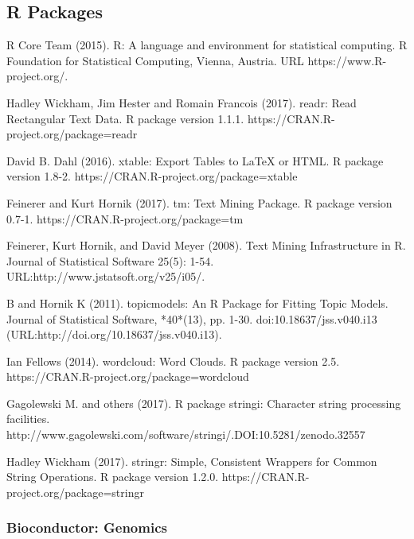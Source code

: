 
\begin{thebibliography}{00}
	\tiny
	\subsection{R Packages}
	
	R Core Team (2015). 
	\newblock R: A language and environment for statistical computing. R Foundation for Statistical Computing, Vienna, Austria.
	\newblock URL https://www.R-project.org/.
	
	 Hadley Wickham, Jim Hester and Romain Francois (2017). readr: Read
	\newblock Rectangular Text Data. R package version 1.1.1.
	\newblock https://CRAN.R-project.org/package=readr
	
	 David B. Dahl (2016). 
	\newblock xtable: Export Tables to LaTeX or HTML. R package version 1.8-2.
	\newblock https://CRAN.R-project.org/package=xtable
	
	  Feinerer and Kurt Hornik (2017).
	\newblock tm: Text Mining Package. 
	\newblock R package version 0.7-1. https://CRAN.R-project.org/package=tm
	
	  Feinerer, Kurt Hornik, and David Meyer (2008). 
	\newblock Text Mining Infrastructure in R. 
	\newblock Journal of Statistical Software 25(5): 1-54. URL:http://www.jstatsoft.org/v25/i05/.
	
	 B and Hornik K (2011).
	\newblock topicmodels: An R Package for Fitting Topic Models.
	\newblock Journal of Statistical Software, *40*(13), pp. 1-30. doi:10.18637/jss.v040.i13 (URL:http://doi.org/10.18637/jss.v040.i13).
	
	 Ian Fellows (2014). 
	\newblock wordcloud: Word Clouds. R package version 2.5.
	\newblock https://CRAN.R-project.org/package=wordcloud
	
	 Gagolewski M. and others (2017). 
	\newblock R package stringi: Character string processing facilities. 
	\newblock http://www.gagolewski.com/software/stringi/.DOI:10.5281/zenodo.32557
	
	 Hadley Wickham (2017).
	\newblock stringr: Simple, Consistent Wrappers for Common String Operations. 
	\newblock R package version 1.2.0. https://CRAN.R-project.org/package=stringr
	
\subsubsection{Bioconductor: Genomics}
	

\end{thebibliography}
